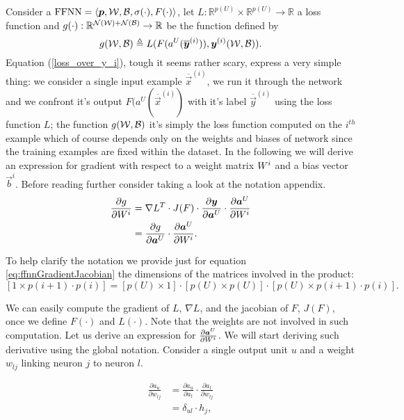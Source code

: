 Consider a $\mathrm{FFNN}=\langle\boldsymbol{p},\mathcal{W},\mathcal{B},\sigma(\cdot),F(\cdot)\rangle$, let $L:\mathbb{R}^{p(U)} \times \mathbb{R}^{p(U)} \rightarrow \mathbb{R}$ a loss function and 
$g(\cdot):\mathbb{R}^{\mathcal{N}(\mathcal{W})+\mathcal{N}(\mathcal{B})} \rightarrow \mathbb{R}$ be the function defined by
\begin{equation}
g(\mathcal{W},\mathcal{B}) \triangleq L(F(a^U( \overline{\boldsymbol{y}}^{(i)} )),\boldsymbol{y}^{(i)}(\mathcal{W},\mathcal{B}) ).
\label{loss_over_y_i}
\end{equation}
Equation (\ref{loss_over_y_i}), tough it seems rather scary, express a very simple thing: we consider a single input example 
$\overline{\vec{x}}^{(i)}$, we run it through the network and we confront it's output $F(a^U( \overline{\vec{x}}^{(i)}) $ with it's label
$\overline{\vec{y}}^{(i)}$ using the loss function $L$; the function $g(\mathcal{W},\mathcal{B})$ it's simply the loss function computed on the $i^{th}$ example
which of course depends only on the weights and biases of network since the training examples are fixed within the dataset. In the following we will derive an expression for gradient with respect to a weight matrix $W^{i}$ and a bias vector $\vec{b}^i$. Before reading further consider taking a look at the notation appendix.
\begin{align}
\label{eq:ffnnGradientJacobian}
\frac{\partial g}{\partial W^i} &= \nabla L^T \cdot J(F) \cdot  \frac{\partial \boldsymbol{y}}{\partial \boldsymbol{a}^U} \cdot \frac{\partial \boldsymbol{a}^U}{\partial W^i}\\
&= \frac{\partial g}{\partial \boldsymbol{a}^U} \cdot \frac{\partial \boldsymbol{a}^U}{\partial W^i}.
\end{align}

To help clarify the notation we provide just for equation \ref{eq:ffnnGradientJacobian} the dimensions of the matrices involved in the product:
$$[1\times p(i+1)\cdot p(i)] = [p(U)\times 1] \cdot [p(U)\times p(U)] \cdot [p(U)\times p(i+1)\cdot p(i)].$$ 

We can easily compute the gradient of $L$, $\nabla L$, and the jacobian of $F$, $J(F)$, once we define $F(\cdot)$ and $L(\cdot)$. Note that the weights are not involved in such computation.
Let us derive an expression for $\frac{\partial \boldsymbol{a}^U}{\partial W^i}$.
We will start deriving such derivative using the global notation. Consider a single output unit $u$ and a weight $w_{lj}$ linking neuron $j$ to neuron $l$.


\begin{align}
\frac{\partial a_u}{\partial w_{lj}} &= \frac{\partial a_u}{\partial a_l} \cdot \frac{\partial a_l}{\partial w_{lj}}\\
&=\delta_{ul} \cdot h_j,
\end{align}

